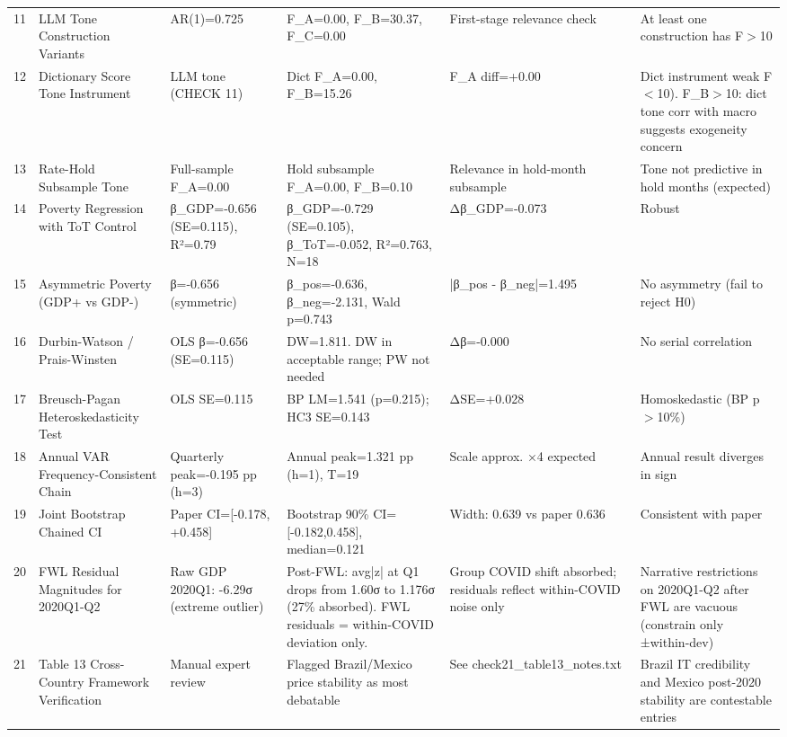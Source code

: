 \begin{small}
\begin{longtable}{llp{3.2cm}p{3.2cm}p{1.5cm}p{3cm}}
11 & LLM Tone Construction Variants & AR(1)=0.725 & F\_A=0.00, F\_B=30.37, F\_C=0.00 & First-stage relevance check & At least one construction has F$>$10 \\
12 & Dictionary Score Tone Instrument & LLM tone (CHECK 11) & Dict F\_A=0.00, F\_B=15.26 & F\_A diff=+0.00 & Dict instrument weak F$<$10). F\_B$>$10: dict tone corr with macro suggests exogeneity concern \\
13 & Rate-Hold Subsample Tone & Full-sample F\_A=0.00 & Hold subsample F\_A=0.00, F\_B=0.10 & Relevance in hold-month subsample & Tone not predictive in hold months (expected) \\
14 & Poverty Regression with ToT Control & β\_GDP=-0.656 (SE=0.115), R²=0.79 & β\_GDP=-0.729 (SE=0.105), β\_ToT=-0.052, R²=0.763, N=18 & Δβ\_GDP=-0.073 & Robust \\
15 & Asymmetric Poverty (GDP+ vs GDP-) & β=-0.656 (symmetric) & β\_pos=-0.636, β\_neg=-2.131, Wald p=0.743 & |β\_pos - β\_neg|=1.495 & No asymmetry (fail to reject H0) \\
16 & Durbin-Watson / Prais-Winsten & OLS β=-0.656 (SE=0.115) & DW=1.811. DW in acceptable range; PW not needed & Δβ=-0.000 & No serial correlation \\
17 & Breusch-Pagan Heteroskedasticity Test & OLS SE=0.115 & BP LM=1.541 (p=0.215); HC3 SE=0.143 & ΔSE=+0.028 & Homoskedastic (BP p$>$10\%) \\
18 & Annual VAR Frequency-Consistent Chain & Quarterly peak=-0.195 pp (h=3) & Annual peak=1.321 pp (h=1), T=19 & Scale approx. ×4 expected & Annual result diverges in sign \\
19 & Joint Bootstrap Chained CI & Paper CI=[-0.178, +0.458] & Bootstrap 90\% CI=[-0.182,0.458], median=0.121 & Width: 0.639 vs paper 0.636 & Consistent with paper \\
20 & FWL Residual Magnitudes for 2020Q1-Q2 & Raw GDP 2020Q1: -6.29σ (extreme outlier) & Post-FWL: avg|z| at Q1 drops from 1.60σ to 1.176σ (27\% absorbed). FWL residuals = within-COVID deviation only. & Group COVID shift absorbed; residuals reflect within-COVID noise only & Narrative restrictions on 2020Q1-Q2 after FWL are vacuous (constrain only ±within-dev) \\
21 & Table 13 Cross-Country Framework Verification & Manual expert review & Flagged Brazil/Mexico price stability as most debatable & See check21\_table13\_notes.txt & Brazil IT credibility and Mexico post-2020 stability are contestable entries \\
\end{longtable}
\end{small}


